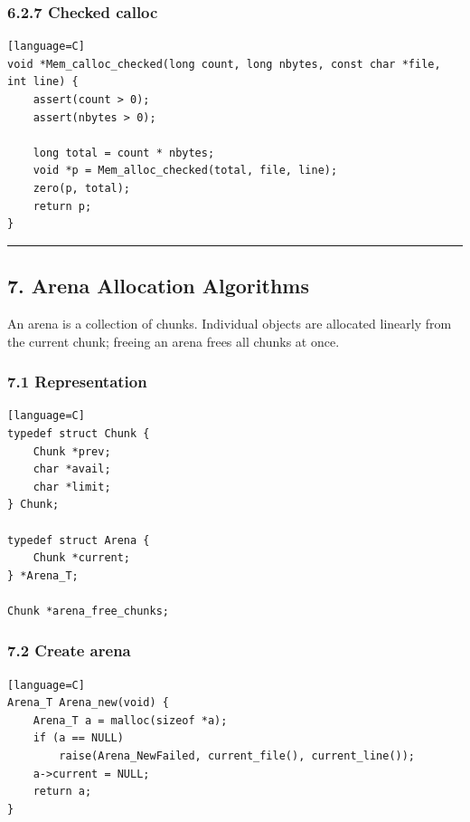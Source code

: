 \documentclass[11pt]{article}
\begin{document}
\subsubsection{6.2.7 Checked calloc}\label{checked-calloc}

\begin{verbatim}[language=C]
void *Mem_calloc_checked(long count, long nbytes, const char *file, int line) {
    assert(count > 0);
    assert(nbytes > 0);

    long total = count * nbytes;
    void *p = Mem_alloc_checked(total, file, line);
    zero(p, total);
    return p;
}
\end{verbatim}

\begin{center}\rule{0.5\linewidth}{0.5pt}\end{center}

\subsection{7. Arena Allocation Algorithms}\label{arena-allocation-algorithms}

An arena is a collection of chunks. Individual objects are allocated linearly from the current chunk; freeing an arena frees all chunks at once.

\subsubsection{7.1 Representation}\label{representation}

\begin{verbatim}[language=C]
typedef struct Chunk {
    Chunk *prev;
    char *avail;
    char *limit;
} Chunk;

typedef struct Arena {
    Chunk *current;
} *Arena_T;

Chunk *arena_free_chunks;
\end{verbatim}

\subsubsection{7.2 Create arena}\label{create-arena}

\begin{verbatim}[language=C]
Arena_T Arena_new(void) {
    Arena_T a = malloc(sizeof *a);
    if (a == NULL)
        raise(Arena_NewFailed, current_file(), current_line());
    a->current = NULL;
    return a;
}
\end{verbatim}
\end{document}

